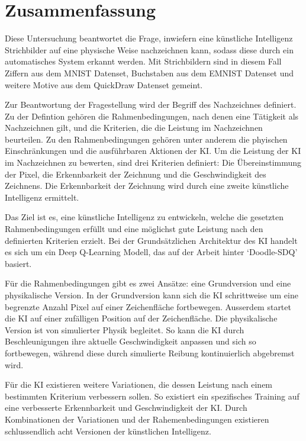 \chapter{Zusammenfassung}\label{zusammenfassung}
Diese Untersuchung beantwortet die Frage, inwiefern eine künstliche Intelligenz
Strichbilder auf eine physische Weise nachzeichnen kann, sodass diese durch ein
automatisches System erkannt werden. Mit Strichbildern sind in diesem
Fall Ziffern aus dem MNIST Datenset, Buchstaben aus dem EMNIST Datenset und
weitere Motive aus dem QuickDraw Datenset gemeint. 

Zur Beantwortung der Fragestellung wird der Begriff des Nachzeichnes definiert.
Zu der Defintion gehören die Rahmenbedingungen, nach denen eine Tätigkeit als
Nachzeichnen gilt, und die Kriterien, die die Leistung im Nachzeichnen
beurteilen. Zu den Rahmenbedingungen gehören unter anderem die phyischen
Einschränkungen und die ausführbaren Aktionen der KI. Um die Leistung der KI im
Nachzeichnen zu bewerten, sind drei Kriterien definiert: Die Übereinstimmung der
Pixel, die Erkennbarkeit der Zeichnung und die Geschwindigkeit des Zeichnens.
Die Erkennbarkeit der Zeichnung wird durch eine zweite künstliche Intelligenz
ermittelt.

Das Ziel ist es, eine künstliche Intelligenz zu entwickeln, welche die gesetzten
Rahmenbedingungen erfüllt und eine möglichst gute Leistung nach den definierten
Kriterien erzielt. Bei der Grundsätzlichen Architektur des KI handelt es sich um
ein Deep Q-Learning Modell, das auf der Arbeit hinter `Doodle-SDQ' \cite{zhou_learning_2018}
basiert.

Für die Rahmenbedingungen gibt es zwei Ansätze: eine Grundversion und eine
physikalische Version. In der Grundversion kann sich die KI schrittweise um eine
begrenzte Anzahl Pixel auf einer Zeichenfläche fortbewegen. Ausserdem startet
die KI auf einer zufälligen Position auf der Zeichenfläche. Die physikalische
Version ist von simulierter Physik begleitet. So kann die KI durch
Beschleunigungen ihre aktuelle Geschwindigkeit anpassen und sich so fortbewegen,
während diese durch simulierte Reibung kontinuierlich abgebremst wird. 

Für die KI existieren weitere Variationen, die dessen Leistung nach einem
bestimmten Kriterium verbessern sollen. So existiert ein spezifisches Training
auf eine verbesserte Erkennbarkeit und Geschwindigkeit der KI. Durch
Kombinationen der Variationen und der Rahemenbedingungen existieren
schlussendlich acht Versionen der künstlichen Intelligenz.

